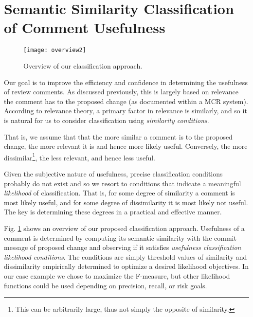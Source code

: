 
\section{Semantic Similarity Classification of Comment Usefulness}
\begin{figure}[!t]
\centering
\texttt{[image: overview2]}
\caption{Overview of our classification approach.}
\label{fig:overview}
\end{figure}

Our goal is to improve the efficiency and confidence in determining the usefulness of review comments.
As discussed previously, this is largely based on relevance the comment has to the proposed change (as documented within a MCR system).
According to relevance theory, a primary factor in relevance is similarly, and so it is natural for us to consider classification using \emph{similarity conditions}. 

That is, we assume that that the more similar a comment is to the proposed change, the more relevant it is and hence more likely useful.
Conversely, the more dissimilar\footnote{This can be arbitrarily large, thus not simply the opposite of similarity.}, the less relevant, and hence less useful.

Given the subjective nature of usefulness, precise classification conditions probably do not exist and so we resort to conditions that indicate a meaningful \emph{likelihood} of classification.
That is, for some degree of similarity a comment is most likely useful, and for some degree of dissimilarity it is most likely not useful.
The key is determining these degrees in a practical and effective manner.

Fig. \ref{fig:overview} shows an overview of our proposed classification approach.
Usefulness of a comment is determined by computing its semantic similarity with the commit message of proposed change and observing if it satisfies \emph{usefulness classification likelihood conditions}.
The conditions are simply threshold values of similarity and dissimilarity empirically determined to optimize a desired likelihood objectives.
In our case example we chose to maximize the F-measure, but other likelihood functions could be used depending on precision, recall, or risk goals.

